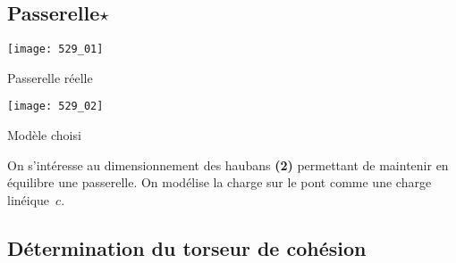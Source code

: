 \normaltrue
\correctionfalse


\subsection*{Passerelle$\star$ \label{C2:10:Coh:529}}
\setcounter{question}{0}

\ifcorrection
\else
{}
\fi



\begin{marginfigure}
\texttt{[image: 529\_01]}

\caption{Passerelle réelle}
\end{marginfigure}

\begin{marginfigure}
\texttt{[image: 529\_02]}

\caption{Modèle choisi}
\end{marginfigure}

On s'intéresse au dimensionnement des haubans \textbf{(2)} permettant de maintenir en équilibre une passerelle.
On modélise la charge sur le pont comme une charge linéique~$c$.

\subsection*{Détermination du torseur de cohésion}
\ifprof
\begin{corrige}~\\
\end{corrige}
\else
\fi

\ifprof
\begin{corrige}~\\
\end{corrige}
\else
\fi

\ifprof
\begin{corrige}~\\
\end{corrige}
\else
\fi

